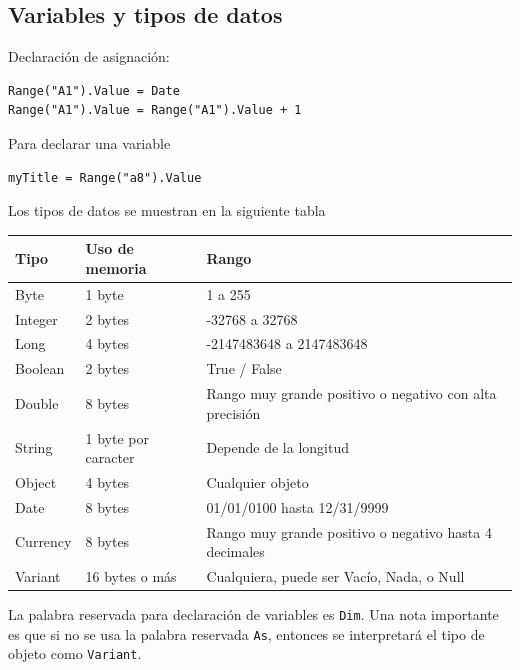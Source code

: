 \subsection{Variables y tipos de datos}

Declaración de asignación:
\begin{verbatim}
Range("A1").Value = Date
Range("A1").Value = Range("A1").Value + 1
\end{verbatim}

Para declarar una variable

\begin{verbatim}
myTitle = Range("a8").Value
\end{verbatim}

Los tipos de datos se muestran en la siguiente tabla

\begin{table}[H]
    \centering
    \begin{tabular}{lll}
    \hline
        \textbf{Tipo} & \textbf{Uso de memoria} & \textbf{Rango} \\ \hline
        \rowcolor{micolor1} Byte & 1 byte & 1 a 255 \\ 
        \rowcolor{micolor2} Integer  & 2 bytes & -32768 a 32768 \\
        \rowcolor{micolor1} Long     & 4 bytes & -2147483648 a 2147483648 \\
        \rowcolor{micolor2} Boolean  & 2 bytes & True / False \\
        \rowcolor{micolor1} Double   & 8 bytes & Rango muy grande positivo o negativo con alta precisión \\
        \rowcolor{micolor2} String   & 1 byte por caracter & Depende de la longitud \\
        \rowcolor{micolor1} Object   & 4 bytes & Cualquier objeto \\
        \rowcolor{micolor2} Date     & 8 bytes & 01/01/0100 hasta 12/31/9999 \\
        \rowcolor{micolor1} Currency & 8 bytes & Rango muy grande positivo o negativo hasta 4 decimales \\
        \rowcolor{micolor2} Variant  & 16 bytes o más & Cualquiera, puede ser Vacío, Nada, o Null \\ 
    \end{tabular}
\end{table}

La palabra reservada para declaración de variables es \texttt{Dim}. Una nota importante es que si no se usa la palabra reservada
\texttt{As}, entonces se interpretará el tipo de objeto como \texttt{Variant}.

